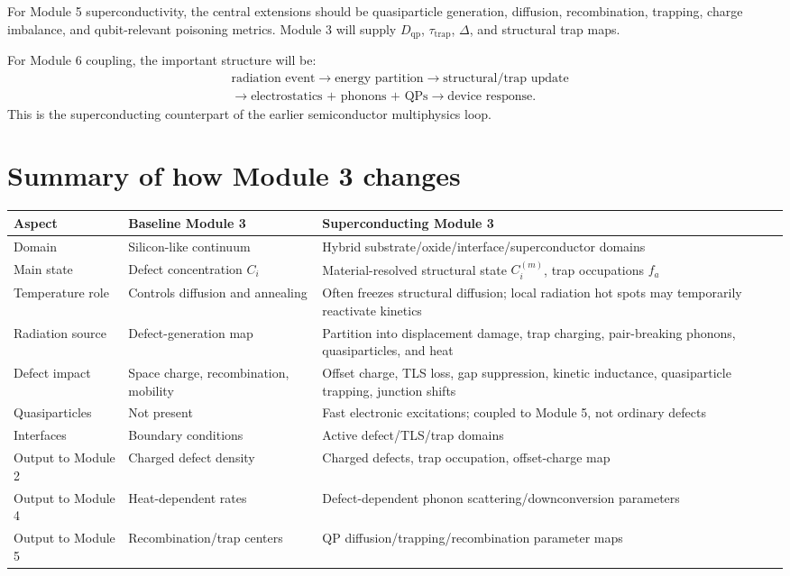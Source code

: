 \documentclass[11pt]{article}
\begin{document}
For Module 5 superconductivity, the central extensions should be quasiparticle generation, diffusion, recombination, trapping, charge imbalance, and qubit-relevant poisoning metrics. Module 3 will supply $D_{\mathrm{qp}}$, $\tau_{\mathrm{trap}}$, $\Delta$, and structural trap maps.

For Module 6 coupling, the important structure will be:
\begin{equation}
\begin{aligned}
&\text{radiation event}
\rightarrow \text{energy partition}
\rightarrow \text{structural/trap update}\\
&\rightarrow \text{electrostatics + phonons + QPs}
\rightarrow \text{device response}.
\end{aligned}
\end{equation}
This is the superconducting counterpart of the earlier semiconductor multiphysics loop.


\section{Summary of how Module 3 changes}

\begin{longtable}{p{} p{} p{}}
\toprule
\textbf{Aspect} & \textbf{Baseline Module 3} & \textbf{Superconducting Module 3} \\
\midrule
\endhead
Domain & Silicon-like continuum & Hybrid substrate/oxide/interface/superconductor domains \\
Main state & Defect concentration $C_i$ & Material-resolved structural state $C_i^{(m)}$, trap occupations $f_a$ \\
Temperature role & Controls diffusion and annealing & Often freezes structural diffusion; local radiation hot spots may temporarily reactivate kinetics \\
Radiation source & Defect-generation map & Partition into displacement damage, trap charging, pair-breaking phonons, quasiparticles, and heat \\
Defect impact & Space charge, recombination, mobility & Offset charge, TLS loss, gap suppression, kinetic inductance, quasiparticle trapping, junction shifts \\
Quasiparticles & Not present & Fast electronic excitations; coupled to Module 5, not ordinary defects \\
Interfaces & Boundary conditions & Active defect/TLS/trap domains \\
Output to Module 2 & Charged defect density & Charged defects, trap occupation, offset-charge map \\
Output to Module 4 & Heat-dependent rates & Defect-dependent phonon scattering/downconversion parameters \\
Output to Module 5 & Recombination/trap centers & QP diffusion/trapping/recombination parameter maps \\
\bottomrule
\end{longtable}
\end{document}
